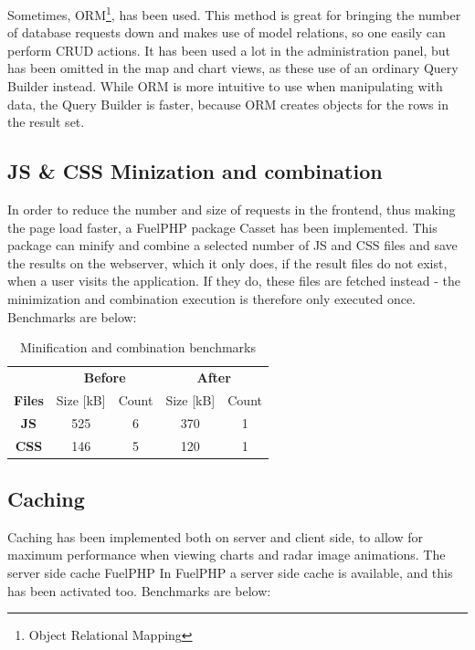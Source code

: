 Sometimes, \textsf{ORM}\footnote{Object Relational Mapping}, has been used. This method is great for bringing the number of database requests down and makes use of model relations, so one easily can perform CRUD actions. It has been used a lot in the administration panel, but has been omitted in the map and chart views, as these use of an ordinary \textsf{Query Builder} instead. While \textsf{ORM} is more intuitive to use when manipulating with data, the \textsf{Query Builder} is faster, because \textsf{ORM} creates objects for the rows in the result set. 

\subsection{JS & CSS Minization and combination}

In order to reduce the number and size of requests in the frontend, thus making the page load faster, a FuelPHP package \textsf{Casset} has been implemented. This package can minify and combine a selected number of \textsf{JS} and \textsf{CSS} files and save the results on the webserver, which it only does, if the result files do not exist, when a user visits the application. If they do, these files are fetched instead - the minimization and combination execution is therefore only executed once. Benchmarks are below:

\begin{table}[htbp]
\centering
\begin{tabular}{| c | c | c | c | c |}
\hline
\multicolumn{1}{|c|}{\multirow{1}{*}{}} & \multicolumn{2}{|c|}{\textbf{Before}} & \multicolumn{2}{|c|}{\textbf{After}} \\ \cline{2-5}
\textbf{Files} & 
Size [kB] & Count & Size [kB] & Count \\ \hline

\textbf{JS} &
525 & 6 & 370 & 1     \\ \hline

\textbf{CSS} &
146 & 5 & 120 & 1\\ \hline
\end{tabular}
\label{tab:minify_css}
\caption{Minification and combination benchmarks}
\end{table}

\subsection{Caching}
Caching has been implemented both on server and client side, to allow for maximum performance when viewing charts and radar image animations. The server side cache FuelPHP  
In FuelPHP a server side cache is available, and this has been activated too. Benchmarks are below:

